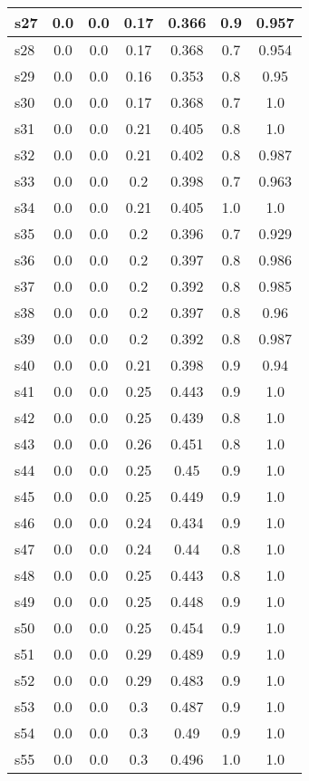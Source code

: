 \documentclass{article}
\begin{document}
\begin{tabular}{|l|c|c|c|c|c|c|}
\hline
s27 &0.0 & 0.0 & 0.17 & 0.366 & 0.9 & 0.957\\
\hline
s28 &0.0 & 0.0 & 0.17 & 0.368 & 0.7 & 0.954\\
\hline
s29 &0.0 & 0.0 & 0.16 & 0.353 & 0.8 & 0.95\\
\hline
s30 &0.0 & 0.0 & 0.17 & 0.368 & 0.7 & 1.0\\
\hline
s31 &0.0 & 0.0 & 0.21 & 0.405 & 0.8 & 1.0\\
\hline
s32 &0.0 & 0.0 & 0.21 & 0.402 & 0.8 & 0.987\\
\hline
s33 &0.0 & 0.0 & 0.2 & 0.398 & 0.7 & 0.963\\
\hline
s34 &0.0 & 0.0 & 0.21 & 0.405 & 1.0 & 1.0\\
\hline
s35 &0.0 & 0.0 & 0.2 & 0.396 & 0.7 & 0.929\\
\hline
s36 &0.0 & 0.0 & 0.2 & 0.397 & 0.8 & 0.986\\
\hline
s37 &0.0 & 0.0 & 0.2 & 0.392 & 0.8 & 0.985\\
\hline
s38 &0.0 & 0.0 & 0.2 & 0.397 & 0.8 & 0.96\\
\hline
s39 &0.0 & 0.0 & 0.2 & 0.392 & 0.8 & 0.987\\
\hline
s40 &0.0 & 0.0 & 0.21 & 0.398 & 0.9 & 0.94\\
\hline
s41 &0.0 & 0.0 & 0.25 & 0.443 & 0.9 & 1.0\\
\hline
s42 &0.0 & 0.0 & 0.25 & 0.439 & 0.8 & 1.0\\
\hline
s43 &0.0 & 0.0 & 0.26 & 0.451 & 0.8 & 1.0\\
\hline
s44 &0.0 & 0.0 & 0.25 & 0.45 & 0.9 & 1.0\\
\hline
s45 &0.0 & 0.0 & 0.25 & 0.449 & 0.9 & 1.0\\
\hline
s46 &0.0 & 0.0 & 0.24 & 0.434 & 0.9 & 1.0\\
\hline
s47 &0.0 & 0.0 & 0.24 & 0.44 & 0.8 & 1.0\\
\hline
s48 &0.0 & 0.0 & 0.25 & 0.443 & 0.8 & 1.0\\
\hline
s49 &0.0 & 0.0 & 0.25 & 0.448 & 0.9 & 1.0\\
\hline
s50 &0.0 & 0.0 & 0.25 & 0.454 & 0.9 & 1.0\\
\hline
s51 &0.0 & 0.0 & 0.29 & 0.489 & 0.9 & 1.0\\
\hline
s52 &0.0 & 0.0 & 0.29 & 0.483 & 0.9 & 1.0\\
\hline
s53 &0.0 & 0.0 & 0.3 & 0.487 & 0.9 & 1.0\\
\hline
s54 &0.0 & 0.0 & 0.3 & 0.49 & 0.9 & 1.0\\
\hline
s55 &0.0 & 0.0 & 0.3 & 0.496 & 1.0 & 1.0\\

\end{tabular}
\end{document}
